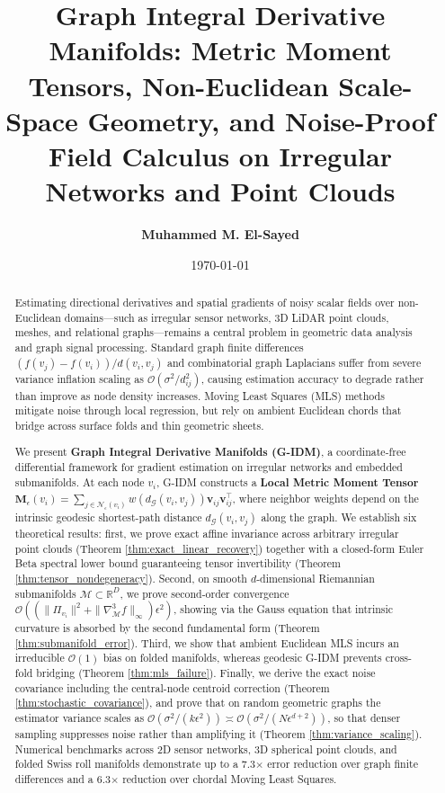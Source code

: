 \documentclass[11pt,a4paper]{article}
\title{\textbf{Graph Integral Derivative Manifolds: Metric Moment Tensors, Non-Euclidean Scale-Space Geometry, and Noise-Proof Field Calculus on Irregular Networks and Point Clouds}}
\author{
  \textbf{Muhammed M. El-Sayed}
}
\date{\today}
\theoremstyle{definition}
\begin{document}
\maketitle

\begin{abstract}
Estimating directional derivatives and spatial gradients of noisy scalar fields over non-Euclidean domains---such as irregular sensor networks, 3D LiDAR point clouds, meshes, and relational graphs---remains a central problem in geometric data analysis and graph signal processing. Standard graph finite differences $(f(v_j)-f(v_i))/d(v_i, v_j)$ and combinatorial graph Laplacians suffer from severe variance inflation scaling as $\mathcal{O}(\sigma^2 / d_{ij}^2)$, causing estimation accuracy to degrade rather than improve as node density increases. Moving Least Squares (MLS) methods mitigate noise through local regression, but rely on ambient Euclidean chords that bridge across surface folds and thin geometric sheets.

We present \textbf{Graph Integral Derivative Manifolds (G-IDM)}, a coordinate-free differential framework for gradient estimation on irregular networks and embedded submanifolds. At each node $v_i$, G-IDM constructs a \textbf{Local Metric Moment Tensor} $\mathbf{M}_\epsilon(v_i) = \sum_{j \in \mathcal{N}_\epsilon(v_i)} w(d_{\mathcal{G}}(v_i, v_j)) \mathbf{v}_{ij} \mathbf{v}_{ij}^\top$, where neighbor weights depend on the intrinsic geodesic shortest-path distance $d_{\mathcal{G}}(v_i, v_j)$ along the graph. We establish six theoretical results: first, we prove exact affine invariance across arbitrary irregular point clouds (Theorem \ref{thm:exact_linear_recovery}) together with a closed-form Euler Beta spectral lower bound guaranteeing tensor invertibility (Theorem \ref{thm:tensor_nondegeneracy}). Second, on smooth $d$-dimensional Riemannian submanifolds $\mathcal{M} \subset \mathbb{R}^D$, we prove second-order convergence $\mathcal{O}((\|\Pi_{v_i}\|^2 + \|\nabla_{\mathcal{M}}^3 f\|_\infty)\epsilon^2)$, showing via the Gauss equation that intrinsic curvature is absorbed by the second fundamental form (Theorem \ref{thm:submanifold_error}). Third, we show that ambient Euclidean MLS incurs an irreducible $\mathcal{O}(1)$ bias on folded manifolds, whereas geodesic G-IDM prevents cross-fold bridging (Theorem \ref{thm:mls_failure}). Finally, we derive the exact noise covariance including the central-node centroid correction (Theorem \ref{thm:stochastic_covariance}), and prove that on random geometric graphs the estimator variance scales as $\mathcal{O}(\sigma^2 / (k\epsilon^2)) \asymp \mathcal{O}(\sigma^2 / (N\epsilon^{d+2}))$, so that denser sampling suppresses noise rather than amplifying it (Theorem \ref{thm:variance_scaling}). Numerical benchmarks across 2D sensor networks, 3D spherical point clouds, and folded Swiss roll manifolds demonstrate up to a 7.3$\times$ error reduction over graph finite differences and a 6.3$\times$ reduction over chordal Moving Least Squares.
\end{abstract}
\end{document}
